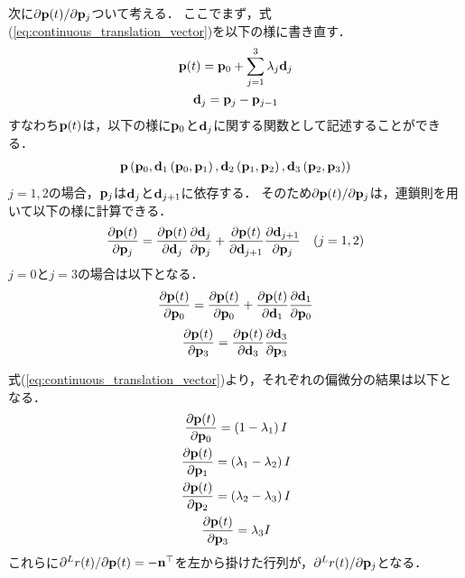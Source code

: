 次に$\partial {\bf p}(t) / \partial {\bf p}_{j}$ついて考える．
ここでまず，式(\ref{eq:continuous_translation_vector})を以下の様に書き直す．
%
\begin{align}
  \begin{gathered}
  {\bf p}(t) = {\bf p}_{0} + \sum_{j=1}^{3} \lambda_{j} {\bf d}_{j} \\
  {\bf d}_{j} = {\bf p}_{j} - {\bf p}_{j-1}
  \end{gathered}
  \label{eq:continuous_translation_vector_delta}
\end{align}
%
すなわち${\bf p}(t)$は，以下の様に${\bf p}_{0}$と${\bf d}_{j}$に関する関数として記述することができる．
%
\begin{align}
  {\bf p} \left(
    {\bf p}_{0},
    {\bf d}_{1} \left( {\bf p}_{0}, {\bf p}_{1} \right),
    {\bf d}_{2} \left( {\bf p}_{1}, {\bf p}_{2} \right),
    {\bf d}_{3} \left( {\bf p}_{2}, {\bf p}_{3} \right)
  \right)
\end{align}
%
$j=1,2$の場合，${\bf p}_{j}$は${\bf d}_{j}$と${\bf d}_{j+1}$に依存する．
そのため$\partial {\bf p}(t) / \partial {\bf p}_{j}$は，連鎖則を用いて以下の様に計算できる．
%
\begin{align}
  \frac{ \partial {\bf p}(t) }{ \partial {\bf p}_{j} }
  =
  \frac{ \partial {\bf p}(t) }{ \partial {\bf d}_{j} }
  \frac{ \partial {\bf d}_{j} }{ \partial {\bf p}_{j} }
  +
  \frac{ \partial {\bf p}(t) }{ \partial {\bf d}_{j+1} }
  \frac{ \partial {\bf d}_{j+1} }{ \partial {\bf p}_{j} }
  ~~~(j=1,2)
\end{align}
%
$j=0$と$j=3$の場合は以下となる．
%
\begin{align}
  \frac{ \partial {\bf p}(t) }{ \partial {\bf p}_{0} }
  =
  \frac{ \partial {\bf p}(t) }{ \partial {\bf p}_{0} }
  +
  \frac{ \partial {\bf p}(t) }{ \partial {\bf d}_{1} }
  \frac{ \partial {\bf d}_{1} }{ \partial {\bf p}_{0} }
\end{align}
%
\begin{align}
  \frac{ \partial {\bf p}(t) }{ \partial {\bf p}_{3} }
  =
  \frac{ \partial {\bf p}(t) }{ \partial {\bf d}_{3} }
  \frac{ \partial {\bf d}_{3} }{ \partial {\bf p}_{3} }
\end{align}
%

式(\ref{eq:continuous_translation_vector})より，それぞれの偏微分の結果は以下となる．
%
\begin{align}
  \begin{gathered}
    \frac{ \partial {\bf p}(t) }{ \partial {\bf p}_{0} }
    =
    \left( 1 - \lambda_{1} \right) I \\
    \frac{ \partial {\bf p}(t) }{ \partial {\bf p}_{1} }
    =
    \left( \lambda_{1} - \lambda_{2} \right) I \\
    \frac{ \partial {\bf p}(t) }{ \partial {\bf p}_{2} }
    =
    \left( \lambda_{2} - \lambda_{3} \right) I \\
    \frac{ \partial {\bf p}(t) }{ \partial {\bf p}_{3} }
    =
    \lambda_{3} I \\
  \end{gathered}
\end{align}
%
これらに$\partial {}^{L}r(t) / \partial {\bf p}(t) = -{\bf n}^{\top}$を左から掛けた行列が，$\partial {}^{L}r(t) / \partial {\bf p}_{j}$となる．

